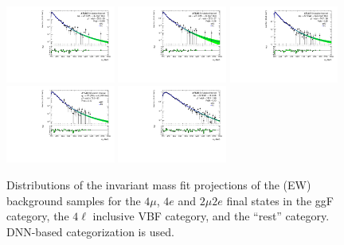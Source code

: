 \begin{figure}[htbp]
    \centering
    \includegraphics[width=0.32\textwidth]{figures/HMHZZ/background/dnn/bkg_shape_qqZZEW_ggF_4mu_180_to_2200_log.pdf}
    \includegraphics[width=0.32\textwidth]{figures/HMHZZ/background/dnn/bkg_shape_qqZZEW_ggF_4e_180_to_2200_log.pdf}
    \includegraphics[width=0.32\textwidth]{figures/HMHZZ/background/dnn/bkg_shape_qqZZEW_ggF_2mu2e_180_to_2200_log.pdf} \\
    \includegraphics[width=0.32\textwidth]{figures/HMHZZ/background/dnn/bkg_shape_qqZZEW_VBF_incl_180_to_2200_log.pdf}
    \includegraphics[width=0.32\textwidth]{figures/HMHZZ/background/dnn/bkg_shape_qqZZEW_rest_180_to_2200_log.pdf}
    \caption{Distributions of the \mfl invariant mass fit projections of the \qqZZ (EW) background samples for the
    $4\mu$, $4e$ and $2\mu 2e$ final states in the ggF category, the $4\ell$ inclusive VBF category, and the ``rest'' category.
    DNN-based categorization is used.} 
    \label{fig:qqZZEW_m4l_shape_all_DNN}
\end{figure}

